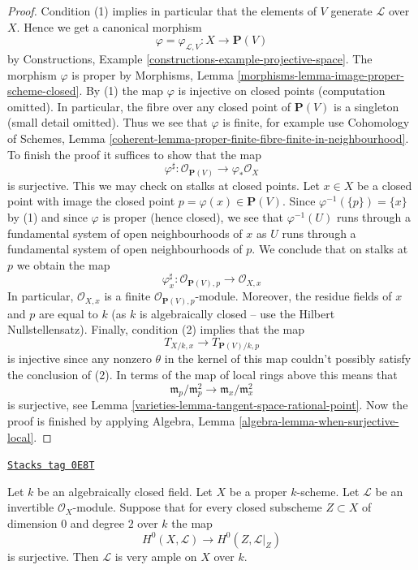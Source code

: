 \begin{proof}

Condition (1) implies in particular that the elements of $V$ generate
$\mathcal{L}$ over $X$. Hence we get a canonical morphism
$$
\varphi = \varphi_{\mathcal{L}, V} :
X
\longrightarrow
\mathbf{P}(V)
$$
by Constructions, Example \ref{constructions-example-projective-space}.
The morphism $\varphi$ is proper by
Morphisms, Lemma \ref{morphisms-lemma-image-proper-scheme-closed}.
By (1) the map $\varphi$ is injective on closed points
(computation omitted).
In particular, the fibre over any closed point of $\mathbf{P}(V)$
is a singleton (small detail omitted). Thus we see that
$\varphi$ is finite, for example use Cohomology of Schemes, Lemma
\ref{coherent-lemma-proper-finite-fibre-finite-in-neighbourhood}.
To finish the proof it suffices to show that the map
$$
\varphi^\sharp :
\mathcal{O}_{\mathbf{P}(V)}
\longrightarrow
\varphi_*\mathcal{O}_X
$$
is surjective. This we may check on stalks at closed points.
Let $x \in X$ be a closed point with image the closed
point $p = \varphi(x) \in \mathbf{P}(V)$. Since
$\varphi^{-1}(\{p\}) = \{x\}$ by (1) and since $\varphi$
is proper (hence closed), we see that $\varphi^{-1}(U)$
runs through a fundamental system of open neighbourhoods
of $x$ as $U$ runs through a fundamental system of open neighbourhoods of $p$.
We conclude that on stalks at $p$ we obtain the map
$$
\varphi^\sharp_x :
\mathcal{O}_{\mathbf{P}(V), p}
\longrightarrow
\mathcal{O}_{X, x}
$$
In particular, $\mathcal{O}_{X, x}$ is a finite
$\mathcal{O}_{\mathbf{P}(V), p}$-module.
Moreover, the residue fields of $x$ and $p$ are equal to $k$
(as $k$ is algebraically closed -- use the Hilbert Nullstellensatz).
Finally, condition (2) implies that the map
$$
T_{X/k, x} \longrightarrow T_{\mathbf{P}(V)/k, p}
$$
is injective since any nonzero $\theta$ in the kernel of this map
couldn't possibly satisfy the conclusion of (2).
In terms of the map of local rings above this means that
$$
\mathfrak m_p/\mathfrak m_p^2 \longrightarrow
\mathfrak m_x/\mathfrak m_x^2
$$
is surjective, see Lemma \ref{varieties-lemma-tangent-space-rational-point}.
Now the proof is finished by applying
Algebra, Lemma \ref{algebra-lemma-when-surjective-local}.
\end{proof}

\begin{lemma}
\label{varieties-lemma-variant-separate-points-tangent-vectors}
\href{https://stacks.math.columbia.edu/tag/0E8T}{\texttt{Stacks tag 0E8T}}

Let $k$ be an algebraically closed field.
Let $X$ be a proper $k$-scheme.
Let $\mathcal{L}$ be an invertible $\mathcal{O}_X$-module.
Suppose that for every closed subscheme $Z \subset X$
of dimension $0$ and degree $2$ over $k$ the map
$$
H^0(X, \mathcal{L}) \longrightarrow H^0(Z, \mathcal{L}|_Z)
$$
is surjective. Then $\mathcal{L}$ is very ample on $X$ over $k$.
\end{lemma}

